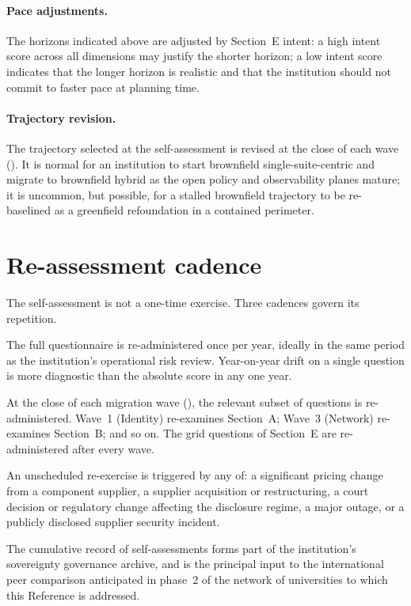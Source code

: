 \paragraph{Pace adjustments.} The horizons indicated above are
adjusted by Section~E intent: a high intent score across all
dimensions may justify the shorter horizon; a low intent score
indicates that the longer horizon is realistic and that the
institution should not commit to faster pace at planning time.

\paragraph{Trajectory revision.} The trajectory selected at the
self-assessment is revised at the close of each wave
(). It is normal for
an institution to start brownfield single-suite-centric and migrate to
brownfield hybrid as the open policy and observability planes mature;
it is uncommon, but possible, for a stalled brownfield trajectory to
be re-baselined as a greenfield refoundation in a contained perimeter.

\section{Re-assessment cadence}
\label{sec:sa-cadence}

The self-assessment is not a one-time exercise. Three cadences govern
its repetition.

\begin{description}[leftmargin=1.5em,style=nextline,nosep]
  \item[Annual review.] The full questionnaire is re-administered
    once per year, ideally in the same period as the institution's
    operational risk review. Year-on-year drift on a single question
    is more diagnostic than the absolute score in any one year.

  \item[Wave closure.] At the close of each migration wave
    (), the relevant subset of questions
    is re-administered. Wave~1 (Identity) re-examines Section~A;
    Wave~3 (Network) re-examines Section~B; and so on. The grid
    questions of Section~E are re-administered after every wave.

  \item[Event-driven re-exercise.] An unscheduled re-exercise is
    triggered by any of: a significant pricing change from a
    component supplier, a supplier acquisition or restructuring, a
    court decision or regulatory change affecting the disclosure
    regime, a major outage, or a publicly disclosed supplier security
    incident.
\end{description}

The cumulative record of self-assessments forms part of the
institution's sovereignty governance archive, and is the principal
input to the international peer comparison anticipated in phase~2 of
the network of universities to which this Reference is addressed.
